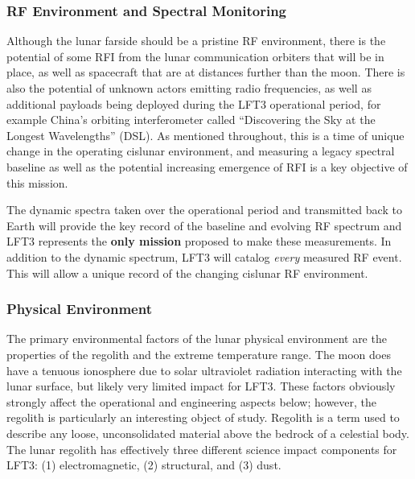 \subsubsection{RF Environment and Spectral Monitoring}
Although the lunar farside should be a pristine RF environment, there is the potential of some RFI from the lunar communication orbiters that will be in place, as well as spacecraft that are at distances further than the moon.  There is also the potential of unknown actors emitting radio frequencies, as well as additional payloads being deployed during the LFT3 operational period, for example China's orbiting interferometer called ``Discovering the Sky at the Longest Wavelengths'' (DSL).  As mentioned throughout, this is a time of unique change in the operating cislunar environment, and measuring a legacy spectral baseline as well as the potential increasing emergence of RFI is a key objective of this mission.

The dynamic spectra taken over the operational period and transmitted back to Earth will provide the key record of the baseline and evolving RF spectrum and LFT3 represents the {\bf only mission} proposed to make these measurements.  In addition to the dynamic spectrum, LFT3 will catalog {\em every} measured RF event.  This will allow a unique record of the changing cislunar RF environment.

\subsubsection{Physical Environment}
The primary environmental factors of the lunar physical environment are the properties of the regolith and the extreme temperature range.  The moon does have a tenuous ionosphere due to solar ultraviolet radiation interacting with the lunar surface, but likely very limited impact for LFT3.  These factors obviously strongly affect the operational and engineering aspects below; however, the regolith is particularly an interesting object of study. Regolith is a term used to describe any loose, unconsolidated material above the bedrock of a celestial body. The lunar regolith has effectively three different science impact components for LFT3: (1) electromagnetic, (2) structural, and (3) dust.


